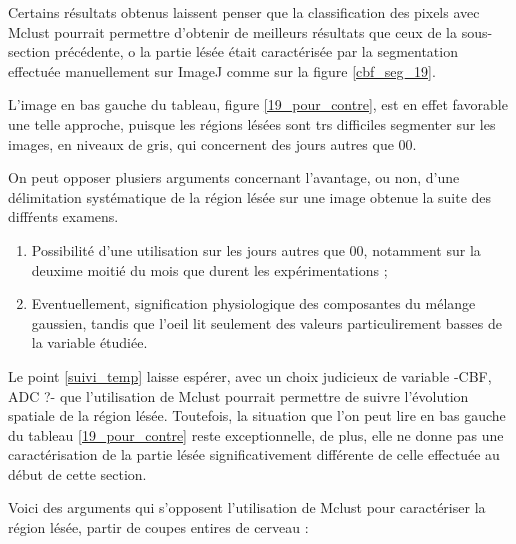 
Certains r\'esultats obtenus laissent penser que la classification des pixels avec Mclust %
pourrait permettre d'obtenir de meilleurs r\'esultats que ceux de la sous-section pr\'ec\'edente, %
o la partie l\'es\'ee \'etait caract\'eris\'ee par la segmentation effectu\'ee manuellement sur ImageJ comme sur la figure \ref{cbf_seg_19}.

\par
L'image en bas  gauche du tableau, figure \ref{19_pour_contre}, est en effet favorable  une telle approche, %
puisque les r\'egions l\'es\'ees sont trs difficiles  segmenter sur les images, en niveaux de gris, qui concernent des jours autres que 00.

\par
On peut opposer plusiers arguments concernant l'avantage, ou non, %
d'une d\'elimitation syst\'ematique de la r\'egion l\'es\'ee sur une image obtenue  la suite des diff\'rents examens.
\begin{enumerate}[label=\textbf{(Pour\arabic*)}]
\item\label{19_suivi_temp} Possibilit\'e d'une utilisation sur les jours autres que 00, notamment sur la deuxime moiti\'e du mois que durent les exp\'erimentations ;
\item\label{phy_gau} Eventuellement, signification physiologique des composantes du m\'elange gaussien, %
tandis que l'oeil lit seulement des valeurs particulirement basses de la variable \'etudi\'ee.
\end{enumerate}

Le point \ref{suivi_temp} laisse esp\'erer, avec un choix judicieux de variable -CBF, ADC ?- %
que l'utilisation de Mclust pourrait permettre de suivre l'\'evolution spatiale de la r\'egion l\'es\'ee. %
Toutefois, la situation que l'on peut lire en bas  gauche du tableau \ref{19_pour_contre} reste exceptionnelle, %
de plus, elle ne donne pas une caract\'erisation de la partie l\'es\'ee significativement diff\'erente de celle effectu\'ee au d\'ebut de cette section.

\etoile
Voici des arguments qui s'opposent  l'utilisation de Mclust pour caract\'eriser la r\'egion l\'es\'ee,  partir de coupes entires de cerveau :

